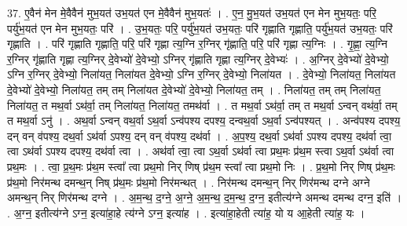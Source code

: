 \documentclass[17pt]{extarticle}
\begin{document}
37. ए॒वैन॑ मेन मे॒वैवैन॑ मुभ॒यत॑ उभ॒यत॑ एन मे॒वैवैन॑ मुभ॒यतः॑ । . ए॒न॒ मु॒भ॒यत॑ उभ॒यत॑ एन मेन मुभ॒यतः॒ परि॒ पर्यु॑भ॒यत॑ एन मेन मुभ॒यतः॒ परि॑ । . उ॒भ॒यतः॒ परि॒ पर्यु॑भ॒यत॑ उभ॒यतः॒ परि॑ गृह्णाति गृह्णाति॒ पर्यु॑भ॒यत॑ उभ॒यतः॒ परि॑ गृह्णाति । . परि॑ गृह्णाति गृह्णाति॒ परि॒ परि॑ गृह्णा त्य॒ग्नि र॒ग्निर् गृ॑ह्णाति॒ परि॒ परि॑ गृह्णा त्य॒ग्निः । . गृ॒ह्णा॒ त्य॒ग्नि र॒ग्निर् गृ॑ह्णाति गृह्णा त्य॒ग्निर् दे॒वेभ्यो॑ दे॒वेभ्यो॒ ऽग्निर् गृ॑ह्णाति गृह्णा त्य॒ग्निर् दे॒वेभ्यः॑ । . अ॒ग्निर् दे॒वेभ्यो॑ दे॒वेभ्यो॒ ऽग्नि र॒ग्निर् दे॒वेभ्यो॒ निला॑यत॒ निला॑यत दे॒वेभ्यो॒ ऽग्नि र॒ग्निर् दे॒वेभ्यो॒ निला॑यत । . दे॒वेभ्यो॒ निला॑यत॒ निला॑यत दे॒वेभ्यो॑ दे॒वेभ्यो॒ निला॑यत॒ तम् तम् निला॑यत दे॒वेभ्यो॑ दे॒वेभ्यो॒ निला॑यत॒ तम् । . निला॑यत॒ तम् तम् निला॑यत॒ निला॑यत॒ त मथ॒र्वा ऽथ॑र्वा॒ तम् निला॑यत॒ निला॑यत॒ तमथ॑र्वा । . त मथ॒र्वा ऽथ॑र्वा॒ तम् त मथ॒र्वा ऽन्वन् वथ॑र्वा॒ तम् त मथ॒र्वा ऽनु॑ । . अथ॒र्वा ऽन्वन् वथ॒र्वा ऽथ॒र्वा ऽन्व॑पश्य दपश्य॒ दन्वथ॒र्वा ऽथ॒र्वा ऽन्व॑पश्यत् । . अन्व॑पश्य दपश्य॒ दन् वन् व॑पश्य॒ दथ॒र्वा ऽथ॑र्वा ऽपश्य॒ दन् वन् व॑पश्य॒ दथ॑र्वा । . अ॒प॒श्य॒ दथ॒र्वा ऽथ॑र्वा ऽपश्य दपश्य॒ दथ॑र्वा त्वा॒ त्वा ऽथ॑र्वा ऽपश्य दपश्य॒ दथ॑र्वा त्वा । . अथ॑र्वा त्वा॒ त्वा ऽथ॒र्वा ऽथ॑र्वा त्वा प्रथ॒मः प्र॑थ॒म स्त्वा ऽथ॒र्वा ऽथ॑र्वा त्वा प्रथ॒मः । . त्वा॒ प्र॒थ॒मः प्र॑थ॒म स्त्वा᳚ त्वा प्रथ॒मो निर् णिष् प्र॑थ॒म स्त्वा᳚ त्वा प्रथ॒मो निः । . प्र॒थ॒मो निर् णिष् प्र॑थ॒मः प्र॑थ॒मो निर॑मन्थ दमन्थ॒न् निष् प्र॑थ॒मः प्र॑थ॒मो निर॑मन्थत् । . निर॑मन्थ दमन्थ॒न् निर् णिर॑मन्थ दग्ने अग्ने अमन्थ॒न् निर् णिर॑मन्थ दग्ने । . अ॒म॒न्थ॒ द॒ग्ने॒ अ॒ग्ने॒ अ॒म॒न्थ॒ द॒म॒न्थ॒ द॒ग्न॒ इतीत्य॑ग्ने अमन्थ दमन्थ दग्न॒ इति॑ । . अ॒ग्न॒ इतीत्य॑ग्ने ऽग्न॒ इत्या॑हा॒हे त्य॑ग्ने ऽग्न॒ इत्या॑ह । . इत्या॑हा॒हेती त्या॑ह॒ यो य आ॒हेती त्या॑ह॒ यः । \newline
\pagebreak
{}
\end{document}
